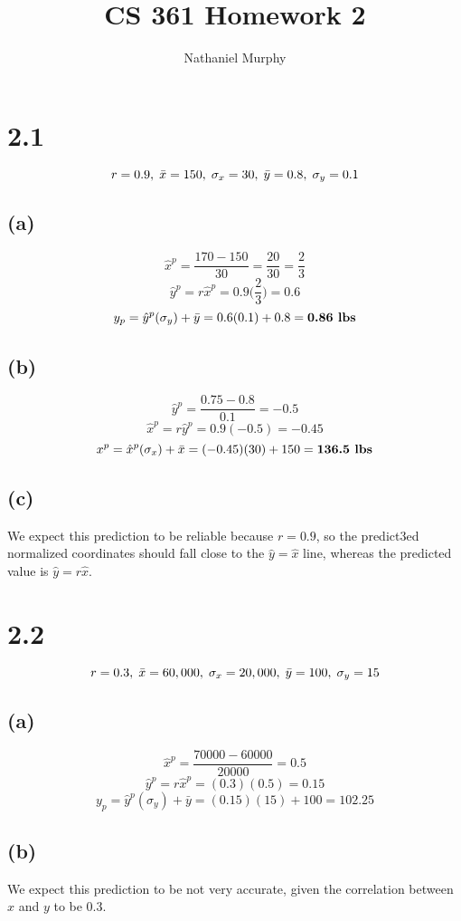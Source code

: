 \documentclass[11pt]{article}
\title{\textbf{CS 361 Homework 2}}
\author{Nathaniel Murphy}
\date{}
\begin{document}
\maketitle

\section*{2.1}
\[r=0.9,\hspace{1mm}\bar{x} = 150,\hspace{1mm}\sigma_x=30,\hspace{1mm}\bar{y}=0.8,\hspace{1mm}\sigma_y=0.1\]
\subsection*{(a)}
\[\hat{x}^p=\frac{170-150}{30}=\frac{20}{30}=\frac{2}{3}\]
\[\hat{y}^p=r\hat{x}^p=0.9\Big(\frac{2}{3}\Big)=0.6\]
\[y_p=\hat{y}^p(\sigma_y)+\bar{y}=0.6(0.1)+0.8=\textbf{0.86\text{ lbs}}\]
\subsection*{(b)}
\[\hat{y}^p=\frac{0.75-0.8}{0.1}=-0.5\]
\[\hat{x}^p=r\hat{y}^p=0.9(-0.5)=-0.45\]
\[x^p=\hat{x}^p(\sigma_x)+\bar{x}=(-0.45)(30)+150=\textbf{136.5\text{ lbs}}\]
\subsection*{(c)}
We expect this prediction to be reliable because $r=0.9$, so the predict3ed normalized coordinates should fall close to the $\hat{y}=\hat{x}$ line, whereas the predicted value is $\hat{y}=r\hat{x}$.
\clearpage
\section*{2.2}
\[r=0.3,\hspace{1mm}\bar{x}=60,000,\hspace{1mm}\sigma_x=20,000,\hspace{1mm}\bar{y}=100,\hspace{1mm}\sigma_y=15\]
\subsection*{(a)}
\[\hat{x}^p=\frac{70000-60000}{20000}=0.5\]
\[\hat{y}^p=r\hat{x}^p=(0.3)(0.5)=0.15\]
\[y_p=\hat{y}^p(\sigma_y)+\bar{y}=(0.15)(15)+100=102.25\]
\subsection*{(b)}
We expect this prediction to be not very accurate, given the correlation between $x$ and $y$ to be 0.3.
\end{document}
